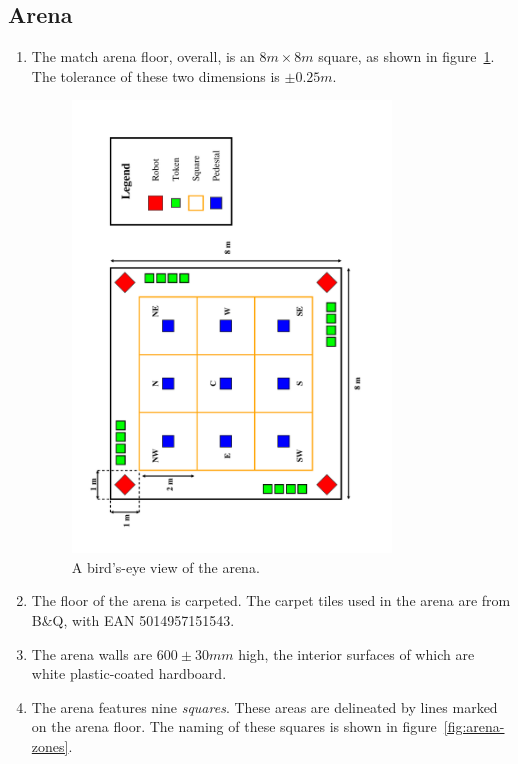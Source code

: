 \subsection{Arena}
\label{sub:arena}
\begin{enumerate}
\item The match arena floor, overall, is an $8m \times 8m$ square, as shown in figure~\ref{fig:arena-dim}.
      The tolerance of these two dimensions is $\pm0.25m$.

\begin{figure}
  \centering
  \includegraphics[width=0.8\textwidth, angle=270]{./images/arena.pdf}
  \caption{\label{fig:arena-dim}A bird's-eye view of the arena.}
\end{figure}

\item The floor of the arena is carpeted.
      The carpet tiles used in the arena are from B\&Q, with EAN 5014957151543.

\item The arena walls are $600\pm30mm$ high, the interior surfaces of which are white plastic-coated hardboard.

\item The arena features nine \textit{squares}.
      These areas are delineated by lines marked on the arena floor.
      The naming of these squares is shown in figure~\ref{fig:arena-zones}.


\end{enumerate}
